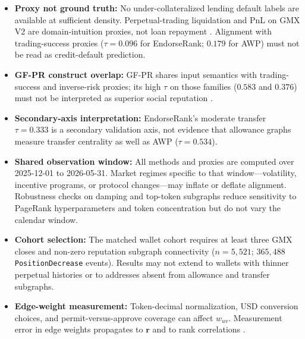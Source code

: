\begin{itemize}
\item \textbf{Proxy not ground truth:} No under-collateralized lending default labels are available at sufficient density. Perpetual-trading liquidation and PnL on GMX V2 are domain-intuition proxies, not loan repayment . Alignment with trading-success proxies ($\tau=0.096$ for EndorseRank; $0.179$ for AWP) must not be read as credit-default prediction.

\item \textbf{GF-PR construct overlap:} GF-PR shares input semantics with trading-success and inverse-risk proxies; its high $\tau$ on those families ($0.583$ and $0.376$) must not be interpreted as superior social reputation .

\item \textbf{Secondary-axis interpretation:} EndorseRank's moderate transfer $\tau=0.333$ is a secondary validation axis, not evidence that allowance graphs measure transfer centrality as well as AWP ($\tau=0.534$).
\end{itemize}


\begin{itemize}
\item \textbf{Shared observation window:} All methods and proxies are computed over 2025-12-01 to 2026-05-31. Market regimes specific to that window---volatility, incentive programs, or protocol changes---may inflate or deflate alignment. Robustness checks on damping and top-token subgraphs reduce sensitivity to PageRank hyperparameters and token concentration but do not vary the calendar window.

\item \textbf{Cohort selection:} The matched wallet cohort requires at least three GMX closes and non-zero reputation subgraph connectivity ($n=5{,}521$; $365{,}488$ \texttt{PositionDecrease} events). Results may not extend to wallets with thinner perpetual histories or to addresses absent from allowance and transfer subgraphs.

\item \textbf{Edge-weight measurement:} Token-decimal normalization, USD conversion choices, and permit-versus-approve coverage can affect $w_{uv}$. Measurement error in edge weights propagates to $\mathbf{r}$ and to rank correlations .
\end{itemize}

